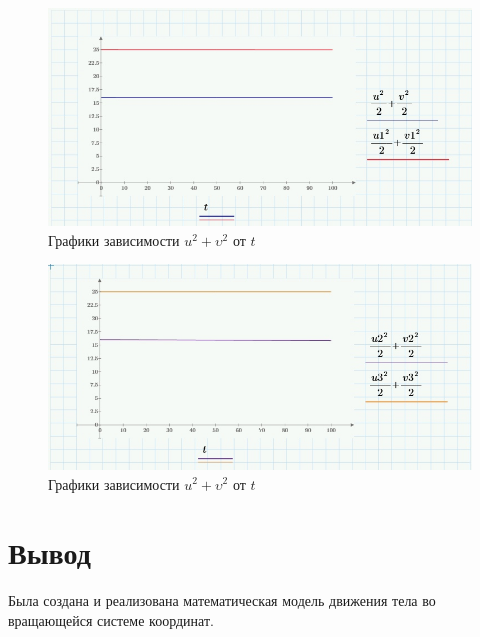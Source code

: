 \documentclass[a4paper, 14pt]{extarticle}
\begin{document}
		\begin{figure}[H]
			\centering
			\includegraphics[width = \linewidth]{2.jpg}
			\caption{Графики зависимости $u^2+\upsilon^2$ от $t$}
		\end{figure}
		\begin{figure}[H]
			\centering
			\includegraphics[width = \linewidth]{3.jpg}
			\caption{Графики зависимости $u^2+\upsilon^2$ от $t$}
		\end{figure}
		
	\section{Вывод}
		Была создана и реализована математическая модель движения тела во вращающейся системе координат.
		
\end{document}
